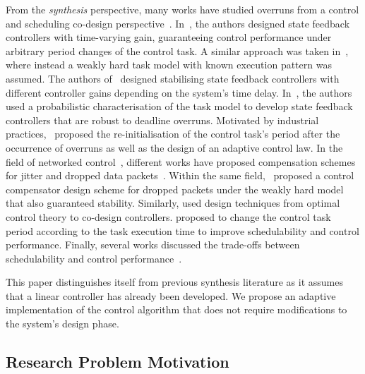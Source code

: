From the \emph{synthesis} perspective, many works have studied overruns from a control and scheduling co-design perspective~\cite{Arzen:2000}. 
In~\cite{Schinkel:2006}, the authors designed state feedback controllers with time-varying gain, guaranteeing control performance under arbitrary period changes of the control task.
A similar approach was taken in~\cite{Ramanathan:1997}, where instead a weakly hard task model with known execution pattern was assumed.
The authors of~\cite{Chakraborty:2012} designed stabilising state feedback controllers with different controller gains depending on the system's time delay.
In~\cite{Pazzaglia:2019}, the authors used a probabilistic characterisation of the task model to develop state feedback controllers that are robust to deadline overruns.
Motivated by industrial practices,~\cite{Pazzaglia:2021} proposed the re-initialisation of the control task's period after the occurrence of overruns as well as the design of an adaptive control law.
In the field of networked control~\cite{Gupta:2010,Torngren:1998}, different works have proposed compensation schemes for jitter and dropped data packets~\cite{Nilsson:1998,Zhang:2001,Hespanha:2007}.
Within the same field,~\cite{Chakraborty:2014} proposed a control compensator design scheme for dropped packets under the weakly hard model that also guaranteed stability.
Similarly, \cite{Linsenmayer:2021} used design techniques from optimal control theory to co-design controllers.
\cite{Caccamo:2000} proposed to change the control task period according to the task execution time to improve schedulability and control performance.
Finally, several works discussed the trade-offs between schedulability and control performance~\cite{Crespo:1999,Eker:1999,Marti:2001,Caccamo:2002}.

This paper distinguishes itself from previous synthesis literature as it assumes that a linear controller has already been developed.
We propose an adaptive implementation of the control algorithm that does not require modifications to the system's design phase.


\subsection{Research Problem Motivation}%
\label{sec:problem-form}%

